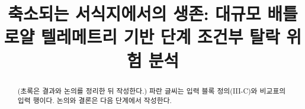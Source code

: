 \documentclass[conference]{IEEEtran}
\newcommand{\rev}[1]{{\color{revblue}#1}}
\begin{document}
\title{축소되는 서식지에서의 생존: 대규모 배틀로얄 텔레메트리 기반 단계 조건부 탈락 위험 분석}
\author{}
\maketitle

\begin{abstract}
(초록은 결과와 논의를 정리한 뒤 작성한다.) \rev{파란 글씨는 입력 블록 정의(III-C)와 비교표의 입력 행이다. 논의와 결론은 다음 단계에서 작성한다.}
\end{abstract}








\end{document}
